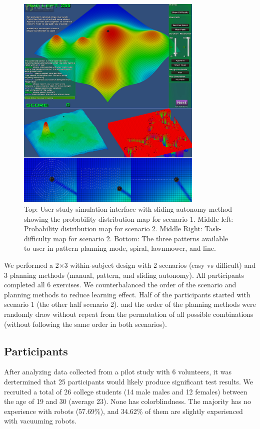 \documentclass[journal]{IEEEtran}
\begin{document}
\begin{figure}
\centering
\includegraphics[width=3.5in]{UserStudy.JPG}
\caption{Top: User study simulation interface with sliding autonomy method showing the probability distribution map for scenario 1. Middle left: Probability distribution map for scenario 2. Middle Right: Task-difficulty map for scenario 2. Bottom: The three patterns available to user in pattern planning mode, spiral, lawnmower, and line.}
\label{UserStudy}
\end{figure}

We performed a 2$\times$3 within-subject design with 2 scenarios (easy vs difficult) and 3 planning methods (manual, pattern, and sliding autonomy). All participants completed all 6 exercises. We counterbalanced the order of the scenario and planning methods to reduce learning effect. Half of the participants started with scenario 1 (the other half scenario 2). and the order of the planning methods were randomly draw without repeat from the permutation of all possible combinations (without following the same order in both scenarios).

\subsection{Participants}

After analyzing data collected from a pilot study with 6 volunteers, it was dertermined that 25 participants would likely produce significant test results. We recruited a total of 26 college students (14 male males and 12 females) between the age of 19 and 30 (average 23). None has colorblindness. The majority has no experience with robots (57.69\%), and 34.62\% of them are slightly experienced with vacuuming robots.
\end{document}
